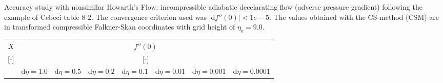 \begin{threeparttable}
    \centering
    \caption{Accuracy study with nonsimilar Howarth's Flow: incompressible adiabatic decelarating flow (adverse pressure gradient) following the example of Cebeci\cite{cebeci1974analysis} table 8-2. The convergence criterion used was $\left| \mathrm{d} f''(0) \right| < 1e-5$. The values obtained with the CS-method (CSM) are in transformed compressible Falkner-Skan coordinates with grid height of $\eta_{\mathrm{e}} = 9.0$.}
    \label{tab:AccH1}
    \begin{tabular}{S[table-format=1.4] S[table-format=1.6] S[table-format=1.6] S[table-format=1.6] S[table-format=1.6] S[table-format=1.6] S[table-format=1.6] S[table-format=1.6]}
        \toprule

                               &
                          \\

                               &
                               \\
        \cmidrule(lr){2-8}

                                 &
                                 &
                                 &
                                 &
                                 &
                                 &
                                 &
            \\
        \midrule


\end{tabular}
\end{threeparttable}
